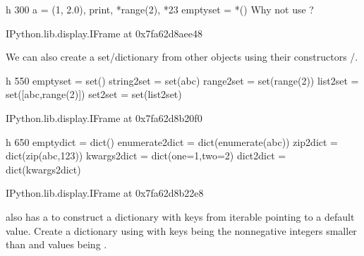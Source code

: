 \documentclass[letterpaper,10pt,english]{sphinxmanual}
\begin{document}
\begin{sphinxVerbatim}[commandchars=\\\{\}]
 \PYGZhy{}h 300
a = \PYGZob{}(1, 2.0), print, *range(2), *\PYGZsq{}23\PYGZsq{}\PYGZcb{}
empty\PYGZus{}set = \PYGZob{}*()\PYGZcb{}  \PYGZsh{} Why not use \PYGZob{}\PYGZcb{}?
\end{sphinxVerbatim}

\begin{sphinxVerbatim}[commandchars=\\\{\}]
\PYGZlt{}IPython.lib.display.IFrame at 0x7fa62d8aee48\PYGZgt{}
\end{sphinxVerbatim}

We can also create a set/dictionary from other objects using their constructors /.

\begin{sphinxVerbatim}[commandchars=\\\{\}]
 \PYGZhy{}h 550
empty\PYGZus{}set = set()
string2set = set(\PYGZsq{}abc\PYGZsq{})
range2set = set(range(2))
list2set = set([\PYGZsq{}abc\PYGZsq{},range(2)])
set2set = set(list2set)
\end{sphinxVerbatim}

\begin{sphinxVerbatim}[commandchars=\\\{\}]
\PYGZlt{}IPython.lib.display.IFrame at 0x7fa62d8b20f0\PYGZgt{}
\end{sphinxVerbatim}

\begin{sphinxVerbatim}[commandchars=\\\{\}]
 \PYGZhy{}h 650
empty\PYGZus{}dict = dict()
enumerate2dict = dict(enumerate(\PYGZsq{}abc\PYGZsq{}))
zip2dict = dict(zip(\PYGZsq{}abc\PYGZsq{},\PYGZsq{}123\PYGZsq{}))
kwargs2dict = dict(one=1,two=2)
dict2dict = dict(kwargs2dict)
\end{sphinxVerbatim}

\begin{sphinxVerbatim}[commandchars=\\\{\}]
\PYGZlt{}IPython.lib.display.IFrame at 0x7fa62d8b22e8\PYGZgt{}
\end{sphinxVerbatim}

  also has a  to construct a dictionary with keys from iterable pointing to a default value. Create a dictionary using  with keys being the non\sphinxhyphen{}negative integers smaller than  and values being .
\end{document}
